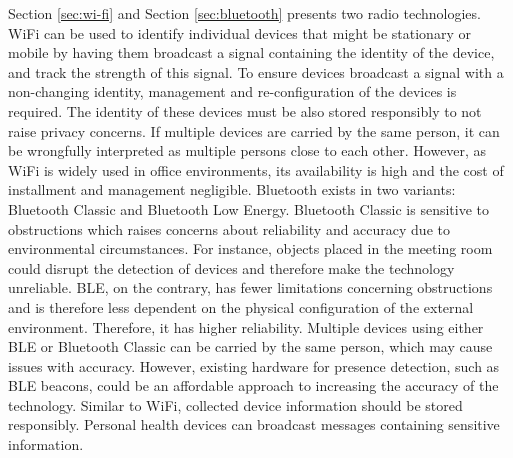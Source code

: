 Section \ref{sec:wi-fi} and Section \ref{sec:bluetooth} presents two radio technologies. 
WiFi can be used to identify individual devices that might be stationary or mobile by having them broadcast a signal containing the identity of the device, and track the strength of this signal.
To ensure devices broadcast a signal with a non-changing identity, management and re-configuration of the devices is required.
The identity of these devices must be also stored responsibly to not raise privacy concerns.
If multiple devices are carried by the same person, it can be wrongfully interpreted as multiple persons close to each other. 
However, as WiFi is widely used in office environments, its availability is high and the cost of installment and management negligible.
Bluetooth exists in two variants: Bluetooth Classic and Bluetooth Low Energy.
Bluetooth Classic is sensitive to obstructions which raises concerns about reliability and accuracy due to environmental circumstances. 
For instance, objects placed in the meeting room could disrupt the detection of devices and therefore make the technology unreliable.
BLE, on the contrary, has fewer limitations concerning obstructions and is therefore less dependent on the physical configuration of the external environment. 
Therefore, it has higher reliability.
Multiple devices using either BLE or Bluetooth Classic can be carried by the same person, which may cause issues with accuracy.
However, existing hardware for presence detection, such as BLE beacons, could be an affordable approach to increasing the accuracy of the technology.  
Similar to WiFi, collected device information should be stored responsibly.
Personal health devices can broadcast messages containing sensitive information.

